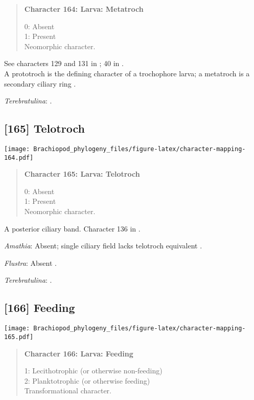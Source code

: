 \documentclass[openany]{book}
\theoremstyle{definition}
\theoremstyle{definition}
\theoremstyle{definition}
\theoremstyle{remark}
\begin{document}
\begin{quote}
\textbf{Character 164: Larva: Metatroch}

0: Absent\\
1: Present\\
Neomorphic character.
\end{quote}

See characters 129 and 131 in \citet{Rouse1999}; 40 in
\citet{Haszprunar1996}.\\
A prototroch is the defining character of a trochophore larva; a
metatroch is a secondary ciliary ring \citep{Rouse1999}.

\hypertarget{Terebratulina-coding-164}{}
\emph{Terebratulina}: \citet{Williams1997Introduction}.

\subsection*{{[}165{]} Telotroch}\label{telotroch}

\texttt{[image: Brachiopod\_phylogeny\_files/figure-latex/character-mapping-164.pdf]}

\begin{quote}
\textbf{Character 165: Larva: Telotroch}

0: Absent\\
1: Present\\
Neomorphic character.
\end{quote}

A posterior ciliary band. Character 136 in \citet{Rouse1999}.

\hypertarget{Amathia-coding-165}{}
\emph{Amathia}: Absent; single ciliary field lacks telotroch equivalent
\citep{Reed1982}.

\hypertarget{Flustra-coding-165}{}
\emph{Flustra}: Absent \citep{Zimmer2013}.

\hypertarget{Terebratulina-coding-165}{}
\emph{Terebratulina}: \citet{Williams1997Introduction}.

\subsection*{{[}166{]} Feeding}\label{feeding}

\texttt{[image: Brachiopod\_phylogeny\_files/figure-latex/character-mapping-165.pdf]}

\begin{quote}
\textbf{Character 166: Larva: Feeding}

1: Lecithotrophic (or otherwise non-feeding)\\
2: Planktotrophic (or otherwise feeding)\\
Transformational character.
\end{quote}
\end{document}
